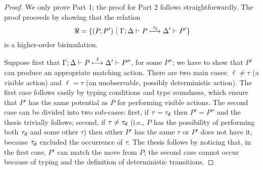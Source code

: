 \begin{proof}
We only prove Part 1; the proof for Part 2 follows straightforwardly.
The proof proceeds by showing that the relation 
$$
\Re = \{ (P,P') ~|~ \Gamma; \Delta \vdash P \stackrel{\tau_{\mathsf{d}}}{\longmapsto} \Delta' \vdash P'\}
$$
is a higher-order bisimulation. 

Suppose first that 
$\Gamma; \Delta \vdash P \stackrel{\ell}{\longmapsto} \Delta' \vdash P''$, for some $P''$; we have to show that $P'$ can produce an appropriate matching action.
There are two main cases: $\ell \neq \tau$ (a visible action) and  $\ell = \tau$ (an unobservable, possibly deterministic action). 
The first case follows easily by typing conditions and type soundness, which ensure that $P'$ has the same potential as $P$ for performing visible actions. 
The second case can be divided into two sub-cases: first, if $\tau = \tau_{\mathsf{d}}$ then $P' = P''$ and the thesis trivially follows; second, if $\tau \neq \tau_{\mathsf{d}}$ (i.e., $P$ has the possibility of performing both $\tau_{\mathsf{d}}$ and some other $\tau$) 
then either $P'$ has the same $\tau$ or $P'$ does not have it, because $\tau_{\mathsf{d}}$ excluded the occurrence of $\tau$. 
The thesis follows by noticing that, in the first case, $P'$ can match the move from $P$; the second case cannot occur because of typing and the definition of deterministic transitions. 


\end{proof}
